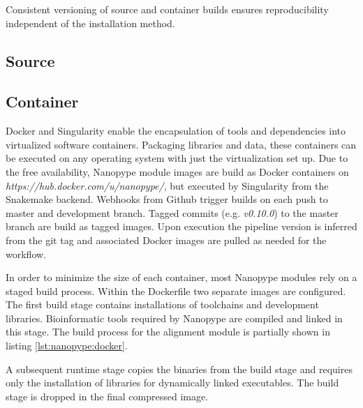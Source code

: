 Consistent versioning of source and container builds ensures reproducibility independent of the installation method.

\subsection{Source}




\subsection{Container}

Docker and Singularity enable the encapsulation of tools and dependencies into virtualized software containers. Packaging libraries and data, these containers can be executed on any operating system with just the virtualization set up. Due to the free availability, Nanopype module images are build as Docker containers on \textit{https://hub.docker.com/u/nanopype/}, but executed by Singularity from the Snakemake backend. Webhooks from Github trigger builds on each push to master and development branch. Tagged commits (e.g. \textit{v0.10.0}) to the master branch are build as tagged images. Upon execution the pipeline version is inferred from the git tag and associated Docker images are pulled as needed for the workflow.


In order to minimize the size of each container, most Nanopype modules rely on a staged build process. Within the Dockerfile two separate images are configured. The first build stage contains installations of toolchains and development libraries. Bioinformatic tools required by Nanopype are compiled and linked in this stage. The build process for the alignment module is partially shown in listing \ref{lst:nanopype:docker}.



A subsequent runtime stage copies the binaries from the build stage and requires only the installation of libraries for dynamically linked executables. The build stage is dropped in the final compressed image.


